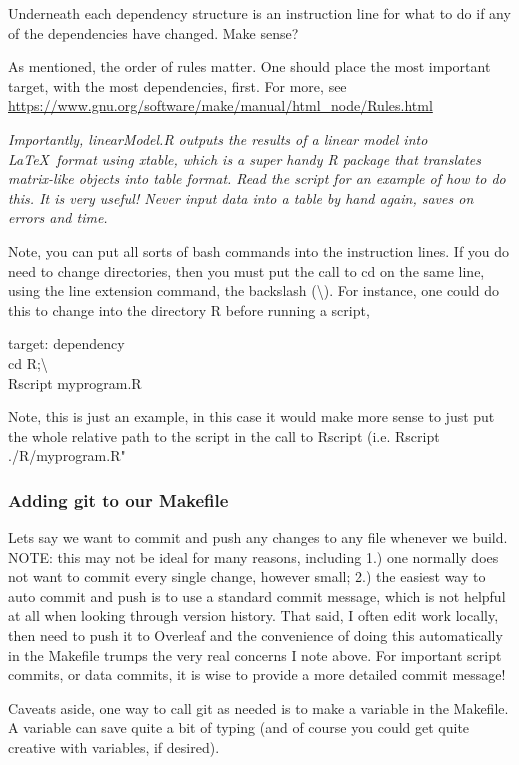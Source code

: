 \documentclass{article}
\begin{document}
Underneath each dependency structure is an instruction line for what to do if any of the dependencies have changed. {\sf Make} sense?

As mentioned, the order of rules matter. One should place the most important target, with the most dependencies, first. For more, see \url{https://www.gnu.org/software/make/manual/html_node/Rules.html}

\emph{Importantly, linearModel.R outputs the results of a linear model into \LaTeX\ format using {\sf xtable}, which is a super handy R package that translates matrix-like objects into table format. Read the script for an example of how to do this. It is very useful! Never input data into a table by hand again, saves on errors and time.}

Note, you can put all sorts of {\sf bash} commands into the instruction lines. If you do need to change directories, then you must put the call to cd on the same line, using the line extension command, the backslash (\textbackslash). For instance, one could do this to change into the directory R before running a script, 

target: dependency\\
\tab cd R;\textbackslash\\
\tab Rscript myprogram.R

Note, this is just an example, in this case it would make more sense to just put the whole relative path to the script in the call to {\sf Rscript} (i.e. Rscript ./R/myprogram.R"

\subsubsection{Adding {\sf git} to our Makefile}

Lets say we want to commit and push any changes to any file whenever we build. NOTE: this may not be ideal for many reasons, including 1.) one normally does not want to commit every single change, however small; 2.) the easiest way to auto commit and push is to use a standard commit message, which is not helpful at all when looking through version history. That said, I often edit work locally, then need to push it to {\sf Overleaf} and the convenience of doing this automatically in the Makefile trumps the very real concerns I note above. For important script commits, or data commits, it is wise to provide a more detailed commit message!

Caveats aside, one way to call {\sf git} as needed is to make a variable in the Makefile. A variable can save quite a bit of typing (and of course you could get quite creative with variables, if desired).
\end{document}
